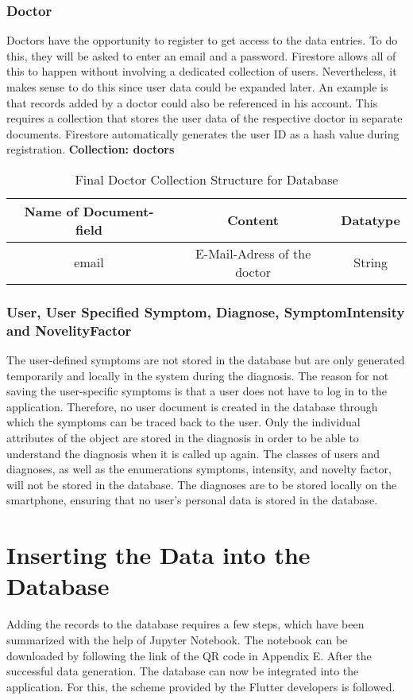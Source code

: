 \subsubsection{Doctor}
Doctors have the opportunity to register to get access to the data entries. To do this, they will be asked to enter an email and a password. Firestore allows all of this to happen without involving a dedicated collection of users. Nevertheless, it makes sense to do this since user data could be expanded later. An example is that records added by a doctor could also be referenced in his account. This requires a collection that stores the user data of the respective doctor in separate documents. Firestore automatically generates the user ID as a hash value during registration.
 \newline
\textbf{Collection: doctors}
\begin{table}[H]
	\centering
	\begin{tabular}{ | c| c| c | } 
		\hline
		Name of Document-field& Content & Datatype \\  
		\hline
		email & E-Mail-Adress of the doctor & String \\
		\hline
	\end{tabular}
	\caption{Final Doctor Collection Structure for Database}
\end{table}
\subsubsection{User, User Specified Symptom, Diagnose, SymptomIntensity and NovelityFactor}
The user-defined symptoms are not stored in the database but are only generated temporarily and locally in the system during the diagnosis. The reason for not saving the user-specific symptoms is that a user does not have to log in to the application. Therefore, no user document is created in the database through which the symptoms can be traced back to the user. Only the individual attributes of the object are stored in the diagnosis in order to be able to understand the diagnosis when it is called up again. The classes of users and diagnoses, as well as the enumerations symptoms, intensity, and novelty factor, will not be stored in the database. The diagnoses are to be stored locally on the smartphone, ensuring that no user's personal data is stored in the database.

\section{Inserting the Data into the Database}
Adding the records to the database requires a few steps, which have been summarized with the help of Jupyter Notebook. The notebook can be downloaded by following the link of the QR code in Appendix E. After the successful data generation. The database can now be integrated into the application. For this, the scheme provided by the Flutter developers is followed.